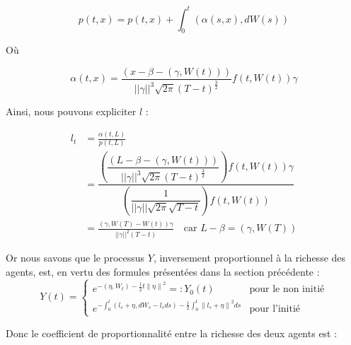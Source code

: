 \documentclass[../finalreport.tex]{subfiles}
\begin{document}
\begin{displaymath}
p \left( t, x \right) = p \left( t, x \right) + \int_0^t \left( \alpha \left(s, x \right), dW \left( s \right) \right)
\end{displaymath}

\par Où

\begin{displaymath}
\alpha \left( t, x \right) = \frac{\left( x - \beta - \left( \gamma, W \left( t \right) \right) \right)}{||\gamma||^3 \sqrt{2 \pi} \left( T - t \right)^{\frac{3}{2}}} f \left( t, W \left( t \right) \right) \gamma
\end{displaymath}

\par Ainsi, nous pouvons expliciter $l$ : 

\begin{displaymath}
	\begin{split}
	l_t &= \frac{\alpha \left(t, L \right)}{p \left(t, L \right)} \\
	&= \dfrac{ \left( \dfrac{\left( L - \beta - \left( \gamma, W \left( t \right) \right) \right)}{||\gamma||^3 \sqrt{2 \pi} \left( T - t \right)^{\frac{3}{2}}} \right) f \left( t, W \left( t \right) \right) \gamma}{ \left( \dfrac{1}{ ||\gamma|| \sqrt{2 \pi} \sqrt{T - t}} \right) f \left( t, W \left( t \right) \right)} \\
	&= \frac{\left( \gamma, W \left( T \right) - W \left( t \right) \right) \gamma}{||\gamma||^2 \left( T - t \right)} \quad \text{car } L - \beta = \left( \gamma, W \left( T \right) \right)
	\end{split}
\end{displaymath}

\par Or nous savons que le processus $Y$, inversement proportionnel à la richesse des agents, est, en vertu des formules présentées dans la section précédente :
\begin{displaymath}
Y \left( t \right) = 
\begin{cases}
e^{- \left( \eta, W_{t} \right)-\frac{1}{2} t {\| \eta \|}^{2}} =: Y_0 \left( t \right) & \text{pour le non initié} \\
e^{- \int_{0}^{t} \left( l_{s} + \eta, dW_{s} - l_s ds \right) - \frac{1}{2} \int_{0}^{t} {\| l_{s} + \eta \|}^{2} ds} & \text{pour l'initié}
\end{cases}
\end{displaymath}

\par Donc le coefficient de proportionnalité entre la richesse des deux agents est : 
\end{document}
